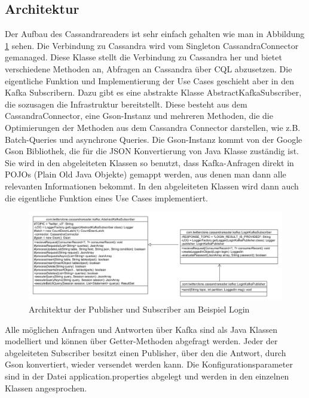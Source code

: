 \subsection{Architektur}
Der Aufbau des Cassandrareaders ist sehr einfach gehalten wie man in Abbildung \ref{fig:archCass} sehen. Die Verbindung zu Cassandra wird vom Singleton CassandraConnector gemanaged. Diese Klasse stellt die Verbindung zu Cassandra her und bietet verschiedene Methoden an, Abfragen an Cassandra über CQL abzusetzen. Die eigentliche Funktion und Implementierung der Use Cases geschieht aber in den Kafka Subscribern. Dazu gibt es eine abstrakte Klasse AbstractKafkaSubscriber, die sozusagen die Infrastruktur bereitstellt. Diese besteht aus dem CassandraConnector, eine Gson-Instanz und mehreren Methoden, die die Optimierungen der Methoden aus dem Cassandra Connector darstellen, wie z.B. Batch-Queries und asynchrone Queries. Die Gson-Instanz kommt von der Google Gson Bibliothek, die für die JSON Konvertierung von Java Klasse zuständig ist. Sie wird in den abgeleiteten Klassen so benutzt, dass Kafka-Anfragen direkt in POJOs (Plain Old Java Objekte) gemappt werden, aus denen man dann alle relevanten Informationen bekommt. In den abgeleiteten Klassen wird dann auch die eigentliche Funktion eines Use Cases implementiert.
\begin{figure}[htbp]
	\centering
	\includegraphics[scale=0.3]{pics/cassandrareader_architecture.png}
	\caption{Architektur der Publisher und Subscriber am Beispiel Login}
	\label{fig:archCass}
\end{figure}
Alle möglichen Anfragen und Antworten über Kafka sind als Java Klassen modelliert und können über Getter-Methoden abgefragt werden. Jeder der abgeleiteten Subscriber besitzt einen Publisher, über den die Antwort, durch Gson konvertiert, wieder versendet werden kann. Die Konfigurationsparameter sind in der Datei application.properties abgelegt und werden in den einzelnen Klassen angesprochen.


